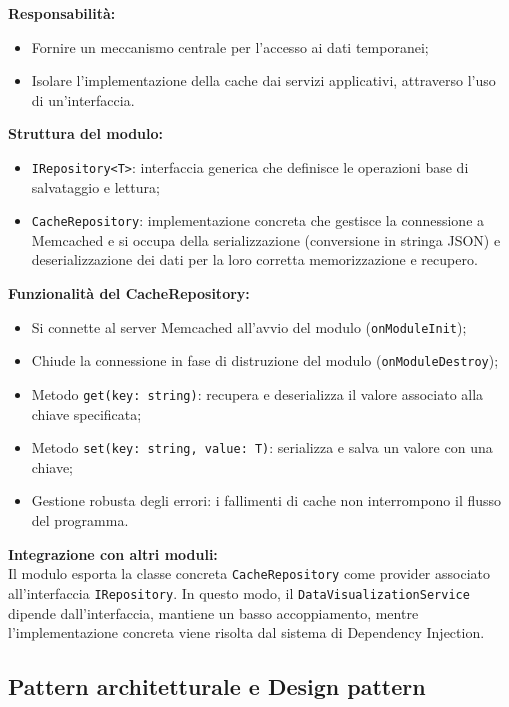 \textbf{Responsabilità:}
\begin{itemize}
    \item Fornire un meccanismo centrale per l’accesso ai dati temporanei;
    \item Isolare l’implementazione della cache dai servizi applicativi, attraverso l’uso di un’interfaccia.
\end{itemize}

\textbf{Struttura del modulo:}
\begin{itemize}
    \item \texttt{IRepository<T>}: interfaccia generica che definisce le operazioni base di salvataggio e lettura;
    \item \texttt{CacheRepository}: implementazione concreta che gestisce la connessione a Memcached e si occupa della serializzazione (conversione in stringa JSON) e deserializzazione dei dati per la loro corretta memorizzazione e recupero.
\end{itemize}

\textbf{Funzionalità del CacheRepository:}
\begin{itemize}
    \item Si connette al server Memcached all’avvio del modulo (\texttt{onModuleInit});
    \item Chiude la connessione in fase di distruzione del modulo (\texttt{onModuleDestroy});
    \item Metodo \texttt{get(key: string)}: recupera e deserializza il valore associato alla chiave specificata;
    \item Metodo \texttt{set(key: string, value: T)}: serializza e salva un valore con una chiave;
    \item Gestione robusta degli errori: i fallimenti di cache non interrompono il flusso del programma.
\end{itemize}

\textbf{Integrazione con altri moduli:} \\
Il modulo esporta la classe concreta \texttt{CacheRepository} come provider associato all'interfaccia \texttt{IRepository}. In questo modo, il \texttt{DataVisualizationService} dipende dall'interfaccia, mantiene un basso accoppiamento, mentre l'implementazione concreta viene risolta dal sistema di Dependency Injection.



\subsection{Pattern architetturale e Design pattern}

